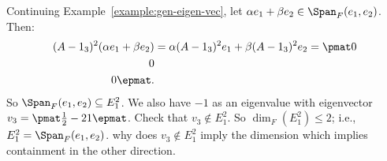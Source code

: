     \begin{example}
        Continuing Example~\ref{example:gen-eigen-vec}, let $\alpha e_1 + \beta e_2 \in \Span_F{(e_1,e_2)}$. Then:
            \begin{equation*}
            \begin{split}
                (A - 1_3)^2 (\alpha e_1 + \beta e_2)
                & = \alpha (A - 1_3)^2  e_1 + \beta(A - 1_3)^2  e_2
                 = \pmat 0 \\ 0 \\ 0 \epmat.
            \end{split}
            \end{equation*}
        So $\Span_F{(e_1,e_2)} \subseteq E_1^2$. We also have $-1$ as an eigenvalue with eigenvector $v_3 = \pmat \frac{1}{2} \\ -2 \\ 1 \epmat$. Check that $v_3 \not\in E_1^2$. So $\dim_F{(E_1^2)} \leq 2$; i.e., $E_1^2 = \Span_F{(e_1,e_2)}$. {\color{red} why does $v_3 \not\in E_1^2$ imply the dimension which implies containment in the other direction}.
    \end{example}
    
